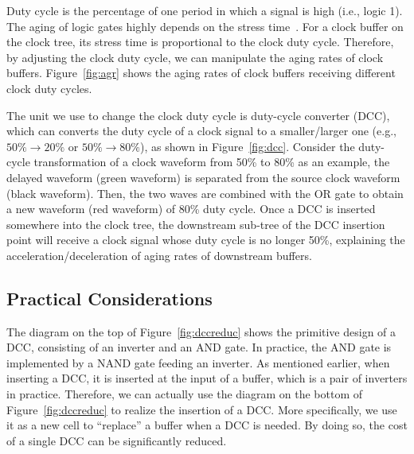 Duty cycle is the percentage of one period in which a signal is high (i.e., logic 1). The aging of logic gates highly depends on the stress time~\cite{wang2010impact}. For a clock buffer on the clock tree, its stress time is proportional to the clock duty cycle. Therefore, by adjusting the clock duty cycle, we can manipulate the aging rates of clock buffers. Figure~\ref{fig:agr} shows the aging rates of clock buffers receiving different clock duty cycles. 

The unit we use to change the clock duty cycle is duty-cycle converter (DCC), which can converts the duty cycle of a clock signal to a smaller/larger one (e.g., $50\% \rightarrow 20\%$ or $50\% \rightarrow 80\%$), as shown in Figure~\ref{fig:dcc}. Consider the duty-cycle transformation of a clock waveform from 50\% to 80\% as an example, the delayed waveform (green waveform) is separated from the source clock waveform (black waveform). Then, the two waves are combined with the OR gate to obtain a new waveform (red waveform) of 80\% duty cycle. Once a DCC is inserted somewhere into the clock tree, the downstream sub-tree of the DCC insertion point will receive a clock signal whose duty cycle is no longer 50\%, explaining the acceleration/deceleration of aging rates of downstream buffers.




\subsection{Practical Considerations}
\label{subsec:tpc}
The diagram on the top of Figure~\ref{fig:dccreduc} shows the primitive design of a DCC, consisting of an inverter and an AND gate. In practice, the AND gate is implemented by a NAND gate feeding an inverter. As mentioned earlier, when inserting a DCC, it is inserted at the input of a buffer, which is a pair of inverters in practice. Therefore, we can actually use the diagram on the bottom of Figure~\ref{fig:dccreduc} to realize the insertion of a DCC. More specifically, we use it as a new cell to \enquote{replace} a buffer when a DCC is needed. By doing so, the cost of a single DCC can be significantly reduced.%
